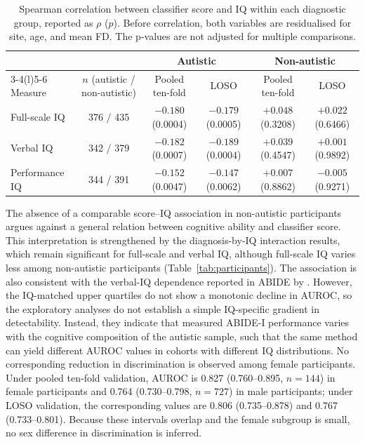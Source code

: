 \begin{table}[t]
\centering
\caption{Spearman correlation between classifier score and IQ within each diagnostic group, reported as $\rho$ ($p$). Before correlation, both variables are residualised for site, age, and mean FD. The p-values are not adjusted for multiple comparisons.}
\label{tab:iq-correlations}
\small
\setlength{\tabcolsep}{4pt}
\begin{tabular}{@{}lccccc@{}}
\toprule
 & & \multicolumn{2}{c}{Autistic} & \multicolumn{2}{c}{Non-autistic} \\
\cmidrule(lr){3-4}\cmidrule(l){5-6}
Measure & $n$ (autistic / non-autistic) & Pooled ten-fold & LOSO & Pooled ten-fold & LOSO \\
\midrule
Full-scale IQ & 376 / 435 & $-0.180$ (0.0004) & $-0.179$ (0.0005) & $+0.048$ (0.3208) & $+0.022$ (0.6466) \\
Verbal IQ & 342 / 379 & $-0.182$ (0.0007) & $-0.189$ (0.0004) & $+0.039$ (0.4547) & $+0.001$ (0.9892) \\
Performance IQ & 344 / 391 & $-0.152$ (0.0047) & $-0.147$ (0.0062) & $+0.007$ (0.8862) & $-0.005$ (0.9271) \\
\bottomrule
\end{tabular}
\end{table}

The absence of a comparable score--IQ association in non-autistic participants argues against a general relation between cognitive ability and classifier score. This interpretation is strengthened by the diagnosis-by-IQ interaction results, which remain significant for full-scale and verbal IQ, although full-scale IQ varies less among non-autistic participants (Table~\ref{tab:participants}). The association is also consistent with the verbal-IQ dependence reported in ABIDE by \citet{Nielsenetal2013}. However, the IQ-matched upper quartiles do not show a monotonic decline in AUROC, so the exploratory analyses do not establish a simple IQ-specific gradient in detectability. Instead, they indicate that measured ABIDE-I performance varies with the cognitive composition of the autistic sample, such that the same method can yield different AUROC values in cohorts with different IQ distributions. No corresponding reduction in discrimination is observed among female participants. Under pooled ten-fold validation, AUROC is 0.827 (0.760--0.895, $n=144$) in female participants and 0.764 (0.730--0.798, $n=727$) in male participants; under LOSO validation, the corresponding values are 0.806 (0.735--0.878) and 0.767 (0.733--0.801). Because these intervals overlap and the female subgroup is small, no sex difference in discrimination is inferred.

